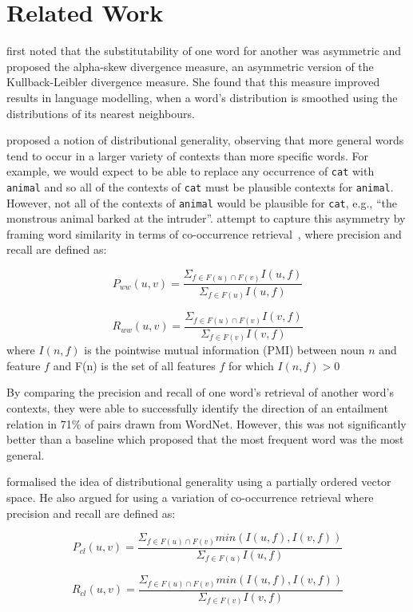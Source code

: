 \documentclass[11pt]{article}
\begin{document}
\section{Related Work}
\label{sect:relwork}

 first noted that the substitutability of one word for another was asymmetric and proposed the alpha-skew divergence measure, an asymmetric version of the Kullback-Leibler divergence measure.  She found that this measure improved results in language modelling, when a word's distribution is smoothed using the distributions of its nearest neighbours.

 proposed a notion of distributional generality, observing that more general words tend to occur in a larger variety of contexts than more specific words.  For example, we would expect to be able to replace any occurrence of \texttt{cat} with \texttt{animal} and so all of the contexts of \texttt{cat} must be plausible contexts for \texttt{animal}.  However, not all of the contexts of \texttt{animal} would be plausible for \texttt{cat}, e.g., ``the monstrous animal barked at the intruder''.   attempt to capture this asymmetry by framing word similarity in terms of co-occurrence retrieval~\cite{Weeds2003}, where precision and recall are defined as:

\[
P_{ww}(u,v) = \frac{\Sigma_{f \in F(u) \cap F(v)} I(u,f)}{\Sigma_{f \in F(u)} I(u,f)}
\]

\[
R_{ww}(u,v) = \frac{\Sigma_{f \in F(u) \cap F(v)} I(v,f)}{\Sigma_{f \in F(v)} I(v,f)}
\]
where $I(n,f)$ is the  pointwise mutual information (PMI) between noun $n$ and feature $f$ and F(n) is the set of all features $f$ for which $I(n,f)>0$

By comparing the precision and recall of one word's retrieval of another word's contexts, they were able to successfully identify the direction of an entailment relation in 71\% of pairs drawn from WordNet.  However, this was not significantly better than a baseline which proposed that the most frequent word was the most general.

 formalised the idea of distributional generality using a partially ordered vector space.  He also argued for using a variation of co-occurrence retrieval where precision and recall are defined as:

\[
P_{cl}(u,v) = \frac{\Sigma_{f \in F(u) \cap F(v)} min(I(u,f),I(v,f))}{\Sigma_{f \in F(u)} I(u,f)}
\]

\[
R_{cl}(u,v) = \frac{\Sigma_{f \in F(u) \cap F(v)} min(I(u,f),I(v,f))}{\Sigma_{f \in F(v)} I(v,f)}
\]
\end{document}
